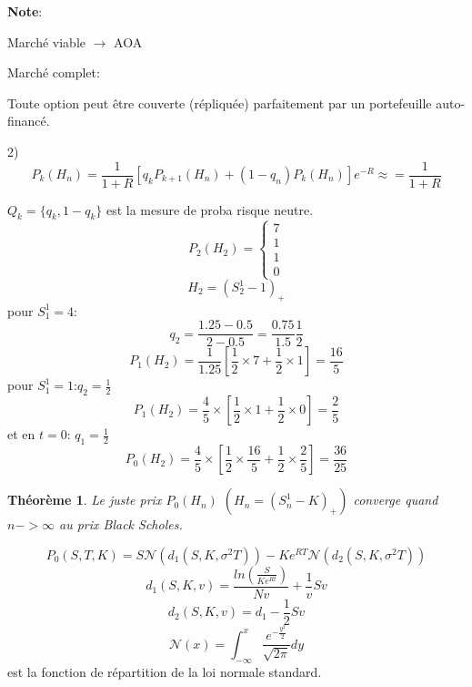 \documentclass{article}
\theoremstyle{plain}
\newtheorem{thm}{Th\'eor\`eme}[section]
\theoremstyle{definition}
\begin{document}
\textbf{Note}:

March\'e viable $\rightarrow$ AOA

March\'e complet:

Toute option peut \^etre couverte (r\'epliqu\'ee) parfaitement par un portefeuille auto-financ\'e. 

2)
\begin{equation}
P_k(H_n)=\frac{1}{1+R}[q_kP_{k+1}(H_n)+(1-q_n)P_{k}(H_n)]e^{-R}\approx=\frac{1}{1+R}
\end{equation}

$Q_k=\{q_k,1-q_k\}$ est la mesure de proba risque neutre.
\begin{equation}
P_2(H_2)=
\left\{\begin{array}{r}
7\\
1\\
1\\
0
\end{array}\right.
\end{equation}
\begin{equation}
H_2=(S_2^1-1)_+
\end{equation}
pour $S_1^1=4$:
\begin{equation}
q_2=\frac{1.25-0.5}{2-0.5}=\frac{0.75}{1.5}\frac{1}{2}
\end{equation}
\begin{equation}
P_1(H_2)=\frac{1}{1.25}[\frac{1}{2}\times 7+\frac{1}{2}\times 1]=\frac{16}{5}
\end{equation}
pour $S_1^1=1$:$q_2=\frac{1}{2}$
\begin{equation}
P_1(H_2)=\frac{4}{5}\times[\frac{1}{2}\times 1+\frac{1}{2}\times 0]=\frac{2}{5}
\end{equation}
et en $t=0$: $q_1=\frac{1}{2}$
\begin{equation}
P_0(H_2)=\frac{4}{5}\times[\frac{1}{2}\times\frac{16}{5}+\frac{1}{2}\times\frac{2}{5}]=\frac{36}{25}
\end{equation}

\begin{thm}
	Le juste prix $P_0(H_n)$ $(H_n=(S_n^1-K)_+)$ converge quand $n->\infty$ au prix Black Scholes.
\end{thm}
\begin{equation}
P_0(S,T,K)=S\mathcal{N}(d_1(S,K,\sigma^2 T))-Ke^{R T}\mathcal{N}(d_2(S,K,\sigma^2 T))
\end{equation}
\begin{equation}
d_1(S,K,v)=\frac{ln(\frac{S}{Ke^{R t}})}{Nv}+\frac{1}{v}Sv
\end{equation}
\begin{equation}
d_2(S,K,v)=d_1-\frac{1}{2}Sv
\end{equation}
\begin{equation}
\mathcal{N}(x)=\int_{-\infty}^x\frac{e^{-\frac{y^2}{2}}}{\sqrt{2\pi}}dy
\end{equation}
est la fonction de r\'epartition de la loi normale standard.
\end{document}

